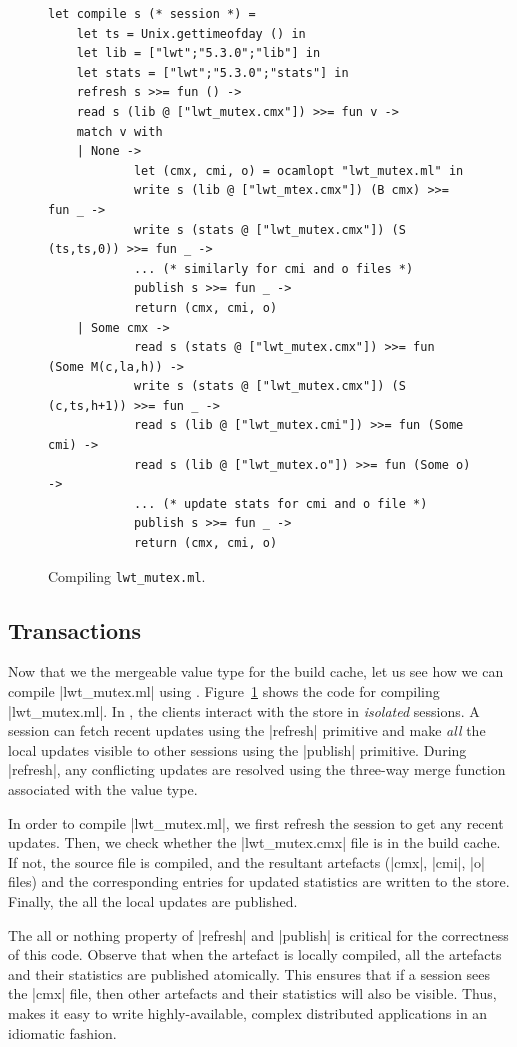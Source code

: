 \begin{figure}%
	\vspace{-0.5cm}
	\begin{lstlisting}
let compile s (* session *) =
	let ts = Unix.gettimeofday () in
	let lib = ["lwt";"5.3.0";"lib"] in
	let stats = ["lwt";"5.3.0";"stats"] in
	refresh s >>= fun () ->
	read s (lib @ ["lwt_mutex.cmx"]) >>= fun v ->
	match v with
	| None ->
			let (cmx, cmi, o) = ocamlopt "lwt_mutex.ml" in
			write s (lib @ ["lwt_mtex.cmx"]) (B cmx) >>= fun _ ->
			write s (stats @ ["lwt_mutex.cmx"]) (S (ts,ts,0)) >>= fun _ ->
			... (* similarly for cmi and o files *)
			publish s >>= fun _ ->
			return (cmx, cmi, o)
	| Some cmx ->
			read s (stats @ ["lwt_mutex.cmx"]) >>= fun (Some M(c,la,h)) ->
			write s (stats @ ["lwt_mutex.cmx"]) (S (c,ts,h+1)) >>= fun _ ->
			read s (lib @ ["lwt_mutex.cmi"]) >>= fun (Some cmi) ->
			read s (lib @ ["lwt_mutex.o"]) >>= fun (Some o) ->
			... (* update stats for cmi and o file *)
			publish s >>= fun _ ->
			return (cmx, cmi, o)
	\end{lstlisting}
	\caption{Compiling \texttt{lwt\_mutex.ml}.}
	\label{code:compile}
	\vspace{-1cm}
\end{figure}

\subsection{Transactions}

Now that we the mergeable value type for the build cache, let us see how we can
compile |lwt_mutex.ml| using \name. Figure~\ref{code:compile} shows the code
for compiling |lwt_mutex.ml|. In \name, the clients interact with the store in
\emph{isolated} sessions. A session can fetch recent updates using the
|refresh| primitive and make \emph{all} the local updates visible to other
sessions using the |publish| primitive. During |refresh|, any conflicting
updates are resolved using the three-way merge function associated with the
value type.

In order to compile |lwt_mutex.ml|, we first refresh the session to get any
recent updates. Then, we check whether the |lwt_mutex.cmx| file is in the build
cache. If not, the source file is compiled, and the resultant artefacts (|cmx|,
|cmi|, |o| files) and the corresponding entries for updated statistics are
written to the store. Finally, the all the local updates are published.

The all or nothing property of |refresh| and |publish| is critical for the
correctness of this code. Observe that when the artefact is locally compiled,
all the artefacts and their statistics are published atomically. This ensures
that if a session sees the |cmx| file, then other artefacts and their
statistics will also be visible. Thus, \name makes it easy to write highly-available,
complex distributed applications in an idiomatic fashion.
